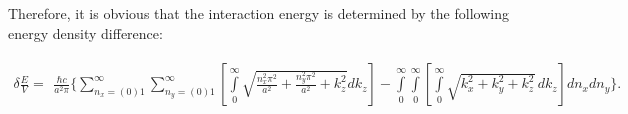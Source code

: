 \documentclass[twoside, 10pt, ptm]{article}
\begin{document}
\begin{multicols}{2}

Therefore, it is obvious that the interaction energy is determined by the following energy density difference:
\end{multicols}
\noindent

\vspace{-3.5mm}
    \begin{equation} \label{eq:2}
\begin{array}{lr}
\delta \frac{E}{V} =
\begin{array}{c}
\frac{\hbar c}{a^2 \pi}\Bigg\{\sum\limits_{n_x=(0)1}^{\infty}\sum\limits_{n_y=(0)1}^{\infty}\left[\int\limits_{0}^{\infty}\sqrt{\frac{n_x^2 \pi^2}{a^2}+\frac{n_y^2 \pi^2}{a^2}+k_z^2} dk_z\right] %
-\int\limits_{0}^{\infty}\int\limits_{0}^{\infty}\left[\int\limits_{0}^{\infty}\sqrt{k_x^2+k_y^2+k_z^2}\,dk_z\right] dn_x dn_y\Bigg\}.
\end{array}\end{array}\end{equation}
\vspace{-3.5mm}
\end{document}
